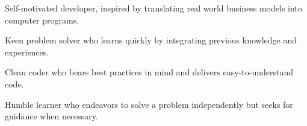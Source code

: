 

\begin{cvlist}
	\item Self-motivated developer, inspired by translating real world business models into computer programs.
	\item Keen problem solver who learns quickly by integrating previous knowledge and experiences.
	\item Clean coder who bears best practices in mind and delivers easy-to-understand code.
	\item Humble learner who endeavors to solve a problem independently but seeks for guidance when necessary. 
\end{cvlist}

